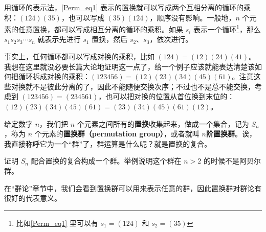 用循环的表示法，\autoref{Perm_eq1}  表示的置换就可以写成两个互相分离的循环的乘积：$(1 2 4)(3 5)$，也可以写成 $(3 5 )(1 2 4)$，顺序没有影响。一般地，$n$ 个元素的任意置换，都可以写成相互分离的循环的乘积。如果 $s_i$ 表示一个循环\footnote{比如\autoref{Perm_eq1} 里可以有 $s_1=(1 2 4)$ 和 $s_2=(3 5)$}，那么 $s_1s_2s_3\cdots s_n$ 就表示先进行 $s_1$ 置换，然后 $s_2$、$s_3$，依次进行。

事实上，任何循环都可以写成对换的乘积，比如 $(1 2 4)=(1 2)(2 4)(4 1)$。我想在这里就没必要长篇大论地证明这一点了，给一个例子应该就能表达清楚该如何把循环拆成对换的乘积：$(1 2 3 4 5 6)=(1 2)(2 3)(3 4)(4 5)(6 1)$。注意这些对换就不是彼此分离的了，因此不能随便交换次序；不过也不是总不能交换，考虑到 $(1 2 3 4 5 6)=(2 3 4 5 6 1)$，也可以把对换的位置从首位换到末位的：$(1 2)(2 3)(3 4)(4 5)(6 1)=(2 3)(3 4)(4 5)(6 1)(1 2)$。

给定数字 $n$，我们把 $n$ 个元素之间所有的\textbf{置换}收集起来，做成一个集合，记为 $S_n$，称为 $n$ 个元素的\textbf{置换群（permutation group）}，或者就叫 $n$\textbf{阶置换群}。诶，我直接称呼它为一个“群”了，群运算是什么呢？就是置换的复合。

\begin{exercise}{}
证明 $S_n$ 配合置换的复合构成一个群。举例说明这个群在 $n>2$ 的时候不是阿贝尔群。
\end{exercise}

在“群论”章节中，我们会看到置换群可以用来表示任意的群，因此置换群对群论有很好的代表意义。




